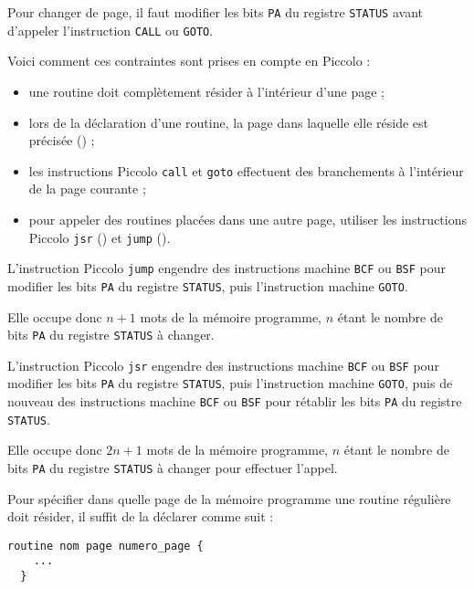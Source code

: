 Pour changer de page, il faut modifier les bits \texttt{PA} du registre \texttt{STATUS} avant d'appeler l'instruction \texttt{CALL} ou \texttt{GOTO}.

Voici comment ces contraintes sont prises en compte en Piccolo :
\begin{itemize}
  \item une routine doit complètement résider à l'intérieur d'une page ;
  \item lors de la déclaration d'une routine, la page dans laquelle elle réside est précisée () ;
  \item les instructions Piccolo \texttt{call} et \texttt{goto} effectuent des branchements à l'intérieur de la page courante ;
  \item pour appeler des routines placées dans une autre page, utiliser les instructions Piccolo \texttt{jsr} () et \texttt{jump} ().
\end{itemize}




L'instruction Piccolo  \texttt{jump} engendre des instructions machine \texttt{BCF} ou \texttt{BSF} pour modifier les bits \texttt{PA} du registre \texttt{STATUS}, puis l'instruction machine \texttt{GOTO}.

Elle occupe donc $n+1$ mots de la mémoire programme, $n$ étant le nombre de bits \texttt{PA} du registre \texttt{STATUS} à changer.





L'instruction Piccolo  \texttt{jsr} engendre des instructions machine \texttt{BCF} ou \texttt{BSF} pour modifier les bits \texttt{PA} du registre \texttt{STATUS}, puis l'instruction machine \texttt{GOTO}, puis de nouveau des instructions machine \texttt{BCF} ou \texttt{BSF} pour rétablir les bits \texttt{PA} du registre \texttt{STATUS}.

Elle occupe donc $2n+1$ mots de la mémoire programme, $n$ étant le nombre de bits \texttt{PA} du registre \texttt{STATUS} à changer pour effectuer l'appel.


Pour spécifier dans quelle page de la mémoire programme une routine régulière doit résider, il suffit de la déclarer comme suit :
\begin{lstlisting}[language=piccolo]
  routine nom page numero_page {
    ...
  }
\end{lstlisting}

